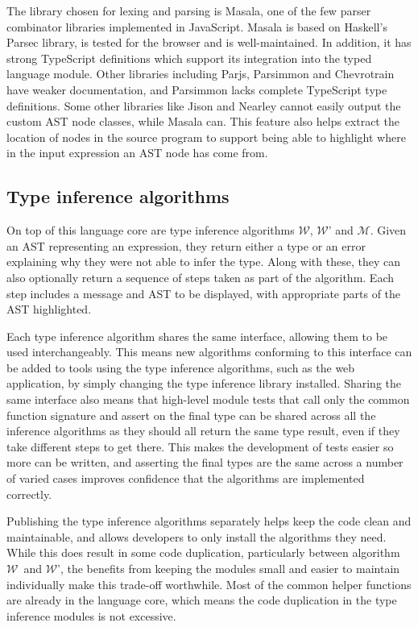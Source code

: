 \documentclass[a4paper,fleqn,oneside,12pt]{report}
\newcommand{\W}{$\mathcal{W}$}
\newcommand{\M}{$\mathcal{M}$}
\begin{document}
The library chosen for lexing and parsing is Masala, one of the few parser combinator libraries implemented in JavaScript. Masala is based on Haskell’s Parsec library, is tested for the browser and is well-maintained. In addition, it has strong TypeScript definitions which support its integration into the typed language module. Other libraries including Parjs, Parsimmon and Chevrotrain have weaker documentation, and Parsimmon lacks complete TypeScript type definitions. Some other libraries like Jison and Nearley cannot easily output the custom AST node classes, while Masala can. This feature also helps extract the location of nodes in the source program to support being able to highlight where in the input expression an AST node has come from.

\subsection{Type inference algorithms}\label{id:h.75leuokwbltp}

On top of this language core are type inference algorithms \W, \W' and \M. Given an AST representing an expression, they return either a type or an error explaining why they were not able to infer the type. Along with these, they can also optionally return a sequence of steps taken as part of the algorithm. Each step includes a message and AST to be displayed, with appropriate parts of the AST highlighted.

Each type inference algorithm shares the same interface, allowing them to be used interchangeably. This means new algorithms conforming to this interface can be added to tools using the type inference algorithms, such as the web application, by simply changing the type inference library installed. Sharing the same interface also means that high-level module tests that call only the common function signature and assert on the final type can be shared across all the inference algorithms as they should all return the same type result, even if they take different steps to get there. This makes the development of tests easier so more can be written, and asserting the final types are the same across a number of varied cases improves confidence that the algorithms are implemented correctly.

Publishing the type inference algorithms separately helps keep the code clean and maintainable, and allows developers to only install the algorithms they need. While this does result in some code duplication, particularly between algorithm \W\ and \W', the benefits from keeping the modules small and easier to maintain individually make this trade-off worthwhile. Most of the common helper functions are already in the language core, which means the code duplication in the type inference modules is not excessive.
\end{document}
